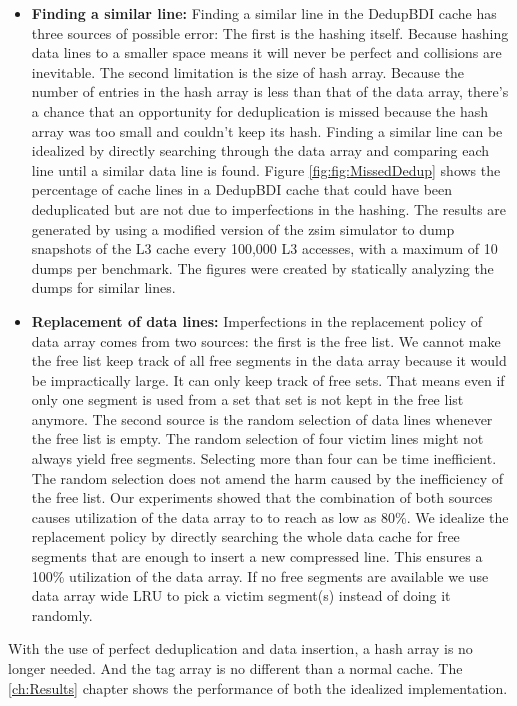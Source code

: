 \begin{itemize}
    \item \textbf{Finding a similar line:} Finding a similar line in the DedupBDI cache has three sources of possible error: The first is the hashing itself. Because hashing data lines to a smaller space means it will never be perfect and collisions are inevitable. The second limitation is the size of hash array. Because the number of entries in the hash array is less than that of the data array, there's a chance that an opportunity for deduplication is missed because the hash array was too small and couldn't keep its hash. Finding a similar line can be idealized by directly searching through the data array and comparing each line until a similar data line is found.
    Figure \ref{fig:fig:MissedDedup} shows the percentage of cache lines in a DedupBDI cache that could have been deduplicated but are not due to imperfections in the hashing. The results are generated by using a modified version of the zsim\cite{zsim} simulator to dump snapshots of the L3 cache every 100,000 L3 accesses, with a maximum of 10 dumps per benchmark. The figures were created by statically analyzing the dumps for similar lines.
    \item \textbf{Replacement of data lines:} Imperfections in the replacement policy of data array comes from two sources: the first is the free list. We cannot make the free list keep track of all free segments in the data array because it would be impractically large. It can only keep track of free sets. That means even if only one segment is used from a set that set is not kept in the free list anymore. The second source is the random selection of data lines whenever the free list is empty. The random selection of four victim lines might not always yield free segments. Selecting more than four can be time inefficient. The random selection does not amend the harm caused by the inefficiency of the free list. Our experiments showed that the combination of both sources causes utilization of the data array to to reach as low as 80\%. We idealize the replacement policy by directly searching the whole data cache for free segments that are enough to insert a new compressed line. This ensures a 100\% utilization of the data array. If no free segments are available we use data array wide LRU to pick a victim segment(s) instead of doing it randomly.
\end{itemize}
With the use of perfect deduplication and data insertion, a hash array is no longer needed. And the tag array is no different than a normal cache. The \ref{ch:Results} chapter shows the performance of both the idealized implementation.


